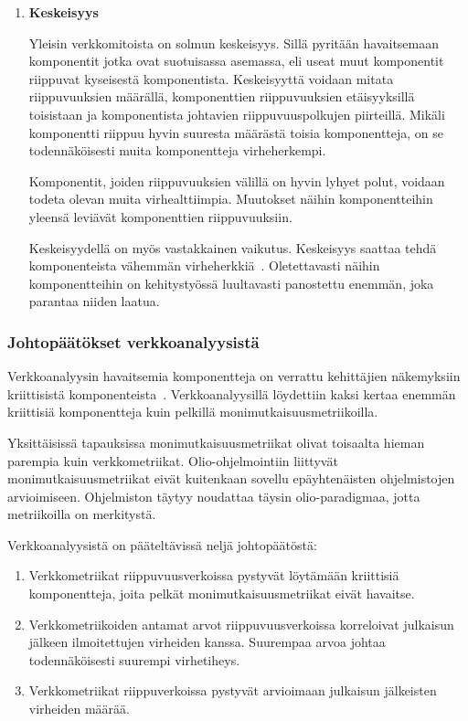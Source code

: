 \documentclass[finnish]{../tktltiki2}
\theoremstyle{definition}
\theoremstyle{remark}
\begin{document}
\begin{enumerate}
    \item {\bf Keskeisyys}
    
    Yleisin verkkomitoista on solmun keskeisyys. Sillä pyritään havaitsemaan komponentit jotka ovat suotuisassa 
    asemassa, eli useat muut komponentit riippuvat kyseisestä komponentista. Keskeisyyttä voidaan mitata riippuvuuksien 
    määrällä, komponenttien riippuvuuksien etäisyyksillä toisistaan ja komponentista johtavien riippuvuuspolkujen 
    piirteillä. Mikäli komponentti riippuu hyvin suuresta määrästä toisia komponentteja, on se todennäköisesti muita 
    komponentteja virheherkempi.
    
    Komponentit, joiden riippuvuuksien välillä on hyvin lyhyet polut, voidaan todeta olevan muita virhealttiimpia. 
    Muutokset näihin komponentteihin yleensä leviävät komponenttien riippuvuuksiin.
    
    Keskeisyydellä on myös vastakkainen vaikutus. Keskeisyys saattaa tehdä komponenteista vähemmän 
    virheherkkiä~\cite{ZN08}. Oletettavasti näihin komponentteihin on kehitystyössä luultavasti panostettu enemmän, joka 
    parantaa niiden laatua.
    
\end{enumerate}

\subsubsection{Johtopäätökset verkkoanalyysistä}

Verkkoanalyysin havaitsemia komponentteja on verrattu kehittäjien näkemyksiin kriittisistä komponenteista~\cite{ZN08}. 
Verkkoanalyysillä löydettiin kaksi kertaa enemmän kriittisiä komponentteja kuin pelkillä monimutkaisuusmetriikoilla.

    Yksittäisissä tapauksissa monimutkaisuusmetriikat olivat toisaalta hieman parempia kuin verkkometriikat. 
Olio-ohjelmointiin liittyvät monimutkaisuusmetriikat eivät kuitenkaan sovellu epäyhtenäisten ohjelmistojen arvioimiseen. 
Ohjelmiston täytyy noudattaa täysin olio-paradigmaa, jotta metriikoilla on merkitystä.\newline

\noindent Verkkoanalyysistä on pääteltävissä neljä johtopäätöstä:

\begin{enumerate}

    \item Verkkometriikat riippuvuusverkoissa pystyvät löytämään kriittisiä komponentteja, joita pelkät 
          monimutkaisuusmetriikat eivät havaitse.
          
    \item Verkkometriikoiden antamat arvot riippuvuusverkoissa korreloivat julkaisun jälkeen ilmoitettujen virheiden 
          kanssa. Suurempaa arvoa johtaa todennäköisesti suurempi virhetiheys.
          
    \item Verkkometriikat riippuverkoissa pystyvät arvioimaan julkaisun jälkeisten virheiden määrää.

\end{enumerate}
\end{document}
